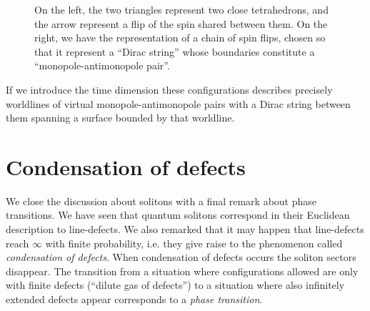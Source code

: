 \documentclass[../main/main.tex]{subfiles}
\begin{document}
\begin{figure}[h]

\caption{On the left, the two triangles represent two close tetrahedrons, and the arrow represent a flip of the spin shared between them. On the right, we have the representation of a chain of spin flips, chosen so that it represent a ``Dirac string'' whose boundaries constitute a ``monopole-antimonopole pair''. }
\label{fig:spin-flips}
\end{figure}

If we introduce the time dimension these configurations describes precisely worldlines of  virtual monopole-antimonopole pairs with a Dirac string between them spanning a surface bounded by that worldline. 

\section{Condensation of defects}

We close the discussion about solitons with a final remark about phase transitions. We have seen that quantum solitons correspond in their Euclidean description to line-defects. We also remarked that it may happen that line-defects reach $\infty$ with finite probability, i.e. they give raise to the phenomenon called \emph{condensation of defects}. When condensation of defects occurs the soliton sectors disappear. The transition from a situation where configurations allowed are only with finite defects (``dilute gas of defects'') to a situation where also infinitely extended defects appear corresponds to a \emph{phase transition}. 
\end{document}
